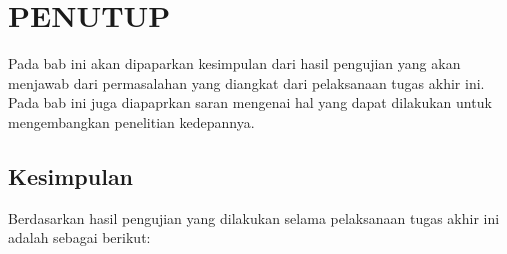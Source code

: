\chapter{PENUTUP}
\label{chap:penutup}

Pada bab ini akan dipaparkan kesimpulan dari hasil pengujian yang akan menjawab dari permasalahan yang diangkat dari pelaksanaan tugas akhir ini. Pada bab ini juga diapaprkan saran mengenai hal yang dapat dilakukan untuk mengembangkan penelitian kedepannya.


\section{Kesimpulan}
\label{sec:kesimpulan}

Berdasarkan hasil pengujian yang dilakukan selama pelaksanaan tugas akhir ini adalah sebagai berikut:

